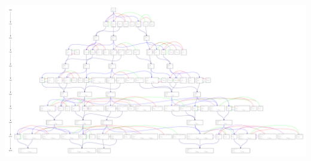 \documentclass[t,11pt,usenames,dvipsnames]{beamer}
\theoremstyle{plain}
\theoremstyle{definition}
\begin{document}
    \begin{frame}{}

       \vfill
        \vfill
        \includegraphics[width=\textwidth]{lifttreeC1_10.pdf}
      \end{frame}

  
\end{document}
